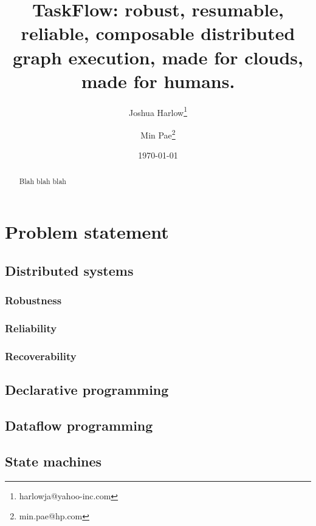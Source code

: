 \documentclass[11pt,a4paper]{article}
\begin{document}
\title{TaskFlow: robust, resumable, reliable, composable distributed graph
       execution, made for clouds, made for humans.}

\author[1]{Joshua Harlow\thanks{harlowja@yahoo-inc.com}}
\author[2]{Min Pae\thanks{min.pae@hp.com}}

\date{\today}

\maketitle

\begin{abstract}

Blah blah blah

\end{abstract}

\section{Problem statement}

\subsection{Distributed systems}

\subsubsection{Robustness}

\subsubsection{Reliability}

\subsubsection{Recoverability}

\subsection{Declarative programming}

\subsection{Dataflow programming}

\subsection{State machines}
\end{document}
